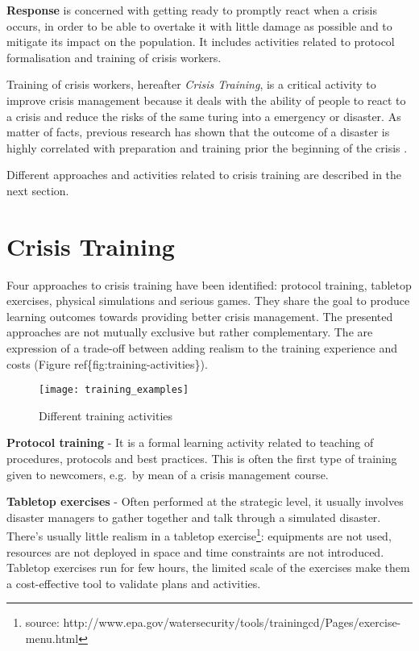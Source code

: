 \textbf{Response} is concerned with getting ready to promptly react when
a crisis occurs, in order to be able to overtake it with little damage
as possible and to mitigate its impact on the population. It includes
activities related to protocol formalisation and training of crisis
workers.

Training of crisis workers, hereafter \emph{Crisis Training}, is a
critical activity to improve crisis management because it deals with the
ability of people to react to a crisis and reduce the risks of the same
turing into a emergency or disaster. As matter of facts, previous
research has shown that the outcome of a disaster is highly correlated
with preparation and training prior the beginning of the crisis
\autocite{Asproth:cb}.

Different approaches and activities related to crisis training are
described in the next section.

\section{Crisis Training}\label{crisis-training}

Four approaches to crisis training have been identified: protocol
training, tabletop exercises, physical simulations and serious games.
They share the goal to produce learning outcomes towards providing
better crisis management. The presented approaches are not mutually
exclusive but rather complementary. The are expression of a trade-off
between adding realism to the training experience and costs (Figure
ref\{fig:training-activities\}).

\begin{figure}[h!]
    \centering
    \texttt{[image: training\_examples]}
    \caption{Different training activities}
    \label{fig:training-activities}
\end{figure}

\textbf{Protocol training} - It is a formal learning activity related to
teaching of procedures, protocols and best practices. This is often the
first type of training given to newcomers, e.g.~by mean of a crisis
management course.

\textbf{Tabletop exercises} - Often performed at the strategic level, it
usually involves disaster managers to gather together and talk through a
simulated disaster. There's usually little realism in a tabletop
exercise\footnote{source:
  http://www.epa.gov/watersecurity/tools/trainingcd/Pages/exercise-menu.html}:
equipments are not used, resources are not deployed in space and time
constraints are not introduced. Tabletop exercises run for few hours,
the limited scale of the exercises make them a cost-effective tool to
validate plans and activities.

